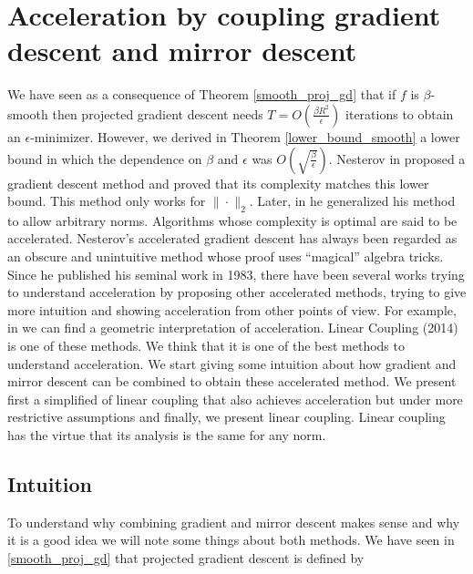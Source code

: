 
\section{Acceleration by coupling gradient descent and mirror descent}
We have seen as a consequence of Theorem \ref{smooth_proj_gd} that if $f$ is $\beta$-smooth then projected gradient descent needs $T = O\left( \frac{\beta R^2}{\epsilon}\right)$ iterations to obtain an $\epsilon$-minimizer. However, we derived in Theorem \ref{lower_bound_smooth} a lower bound in which the dependence on $\beta$ and $\epsilon$ was $O\left(\sqrt{\frac{\beta}{\epsilon}}\right)$. Nesterov in \cite{nesterov1983method} proposed a gradient descent method and proved that its complexity matches this lower bound. This method only works for $\|{\cdot}\|_2$. Later, in \cite{nesterov2005smooth} he generalized his method to allow arbitrary norms. Algorithms whose complexity is optimal are said to be accelerated. Nesterov's accelerated gradient descent has always been regarded as an obscure and unintuitive method whose proof uses ``magical'' algebra tricks. Since he published his seminal work in 1983, there have been several works trying to understand acceleration by proposing other accelerated methods, trying to give more intuition and showing acceleration from other points of view. For example, in \cite{bubeck} we can find a geometric interpretation of acceleration. Linear Coupling \cite{linearcoupling} (2014) is one of these methods. We think that it is one of the best methods to understand acceleration. We start giving some intuition about how gradient and mirror descent can be combined to obtain these accelerated method. We present first a simplified of linear coupling that also achieves acceleration but under more restrictive assumptions and finally, we present linear coupling. Linear coupling has the virtue that its analysis is the same for any norm.

\subsection{Intuition}


To understand why combining gradient and mirror descent makes sense and why it is a good idea we will note some things about both methods. We have seen in \ref{smooth_proj_gd} that projected gradient descent is defined by

